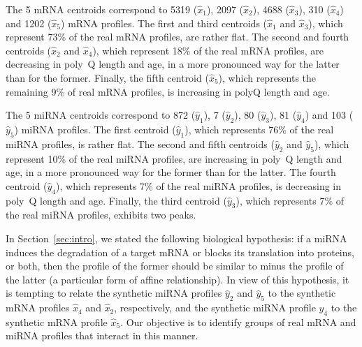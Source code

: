 The   5  mRNA   centroids  correspond   to  5319   ($\hat{x}_{1}$),  2097
  ($\hat{x}_{2}$),   4688  ($\hat{x}_{3}$),   310  ($\hat{x}_{4}$)   and  1202
  ($\hat{x}_{5}$) mRNA profiles. The  first and third centroids ($\hat{x}_{1}$
  and  $\hat{x}_{3}$), which  represent 73\%  of the  real mRNA  profiles, are
  rather   flat.   The   second  and   fourth  centroids   ($\hat{x}_{2}$  and
  $\hat{x}_{4}$),  which  represent  18\%  of  the  real  mRNA  profiles,  are
  decreasing in poly~Q length and age, in a more pronounced way for the latter
  than for  the former.   Finally, the  fifth centroid  ($\hat{x}_{5}$), which
  represents the remaining  9\% of real mRNA profiles, is  increasing in polyQ
  length and age.

The   5   miRNA   centroids   correspond  to   872   ($\hat{y}_{1}$),   7
  ($\hat{y}_{2}$),   80   ($\hat{y}_{3}$),    81   ($\hat{y}_{4}$)   and   103
  ($\hat{y}_{5}$) miRNA  profiles.  The first centroid  ($\hat{y}_{1}$), which
  represents 76\% of  the real miRNA profiles, is rather  flat. The second and
  fifth centroids ($\hat{y}_2$ and $\hat{y}_{5}$), which represent 10\% of the
  real miRNA  profiles, are  increasing in  poly~Q length and  age, in  a more
  pronounced way  for the  former than  for the  latter.  The  fourth centroid
  ($\hat{y}_{4}$),  which  represents  7\%  of the  real  miRNA  profiles,  is
  decreasing  in  poly~Q   length  and  age.   Finally,   the  third  centroid
  ($\hat{y}_{3}$), which represents  7\% of the real  miRNA profiles, exhibits
  two peaks.

In   Section~\ref{sec:intro},   we   stated  the   following   biological
  hypothesis: if  a miRNA induces the  degradation of a target  mRNA or blocks
  its  translation into  proteins, or  both, then  the profile  of the  former
  should be similar to  minus the profile of the latter  (a particular form of
  affine relationship).  In view of this  hypothesis, it is tempting to relate
  the  synthetic  miRNA  profiles   $\hat{y}_{2}$  and  $\hat{y}_{5}$  to  the
  synthetic mRNA  profiles $\hat{x}_{4}$ and $\hat{x}_{2}$,  respectively, and
  the  synthetic miRNA  profile $\hat{y}_{4}$  to the  synthetic mRNA  profile
  $\hat{x}_{5}$. Our  objective is to identify  groups of real mRNA  and miRNA
  profiles that interact in this manner.


